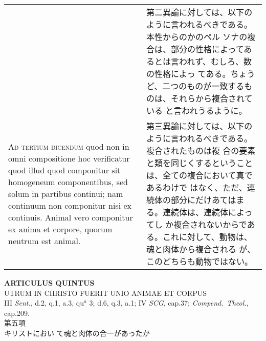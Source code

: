 \documentclass[10pt]{jsarticle} %
\begin{document}
\begin{longtable}{p{21em}p{21em}}
&

第二異論に対しては、以下のように言われるべきである。本性からのかのペル
ソナの複合は、部分の性格によってあるとは言われず、むしろ、数の性格によっ
てある。ちょうど、二つのものが一致するものは、それらから複合されている
と言われうるように。


\\



{\scshape Ad tertium dicendum} quod non in omni compositione hoc
verificatur quod illud quod componitur sit homogeneum componentibus,
sed solum in partibus continui; nam continuum non componitur nisi ex
continuis. Animal vero componitur ex anima et corpore, quorum neutrum
est animal.


&


第三異論に対しては、以下のように言われるべきである。複合されたものは複
合の要素と類を同じくするということは、全ての複合において真であるわけで
はなく、ただ、連続体の部分にだけあてはまる。連続体は、連続体によってし
か複合されないからである。これに対して、動物は、魂と肉体から複合される
が、このどちらも動物ではない。

\\

\end{longtable}
\newpage


\begin{center}
{\Large {\bf ARTICULUS QUINTUS}}\\ {\large UTRUM IN CHRISTO FUERIT
UNIO ANIMAE ET CORPUS}\\ {\footnotesize III {\itshape Sent.}, d.2,
q.1, a.3, qu$^a$ 3; d.6, q.3, a.1; IV {\itshape SCG}, cap.37;
{\itshape Compend.~Theol.}, cap.209.}\\ {\Large 第五項\\キリストにおい
て魂と肉体の合一があったか}
\end{center}
\end{document}
